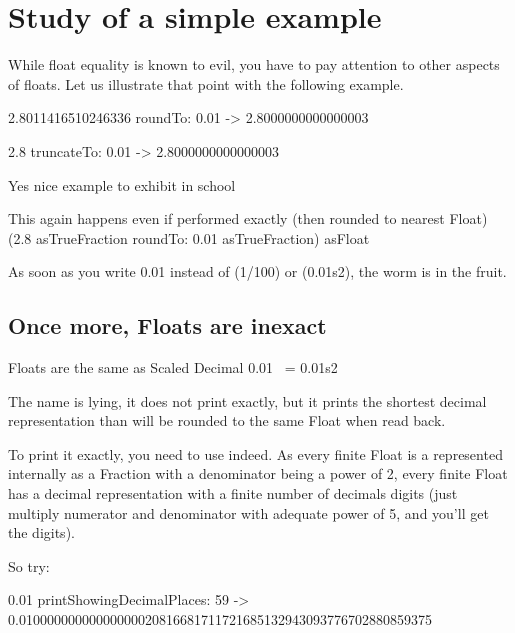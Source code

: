 \documentclass[a4paper,10pt,twoside]{book}
\begin{document}


\section{Study of a simple example}
While float equality is known to evil, you have to pay attention to other aspects of floats. Let us illustrate that point with the following example.


\begin{code}{}
2.8011416510246336 roundTo: 0.01
-> 2.8000000000000003

2.8 truncateTo: 0.01
-> 2.8000000000000003
\end{code}






Yes nice example to exhibit in school

This again happens even if performed exactly (then rounded to nearest Float)
(2.8 asTrueFraction roundTo: 0.01 asTrueFraction) asFloat

As soon as you write 0.01 instead of (1/100) or (0.01s2), the worm is
in the fruit.



\subsection{Once more, Floats are inexact}

\begin{code}{Floats are the same as Scaled Decimal}
   0.01 ~= 0.01s2
\end{code}
   
   
   
   
The name  is lying, it does not print exactly,
but it prints the shortest decimal representation than will be rounded
to the same Float when read back.

To print it exactly, you need to use  indeed.
As every finite Float is a represented internally as a Fraction with a
denominator being a power of 2, every finite Float has a decimal
representation with a finite number of decimals digits (just multiply
numerator and denominator with adequate power of 5, and you'll get the
digits).

So try:

\begin{code}{}
0.01 printShowingDecimalPlaces: 59
-> 0.01000000000000000020816681711721685132943093776702880859375
\end{code}
\end{document}
